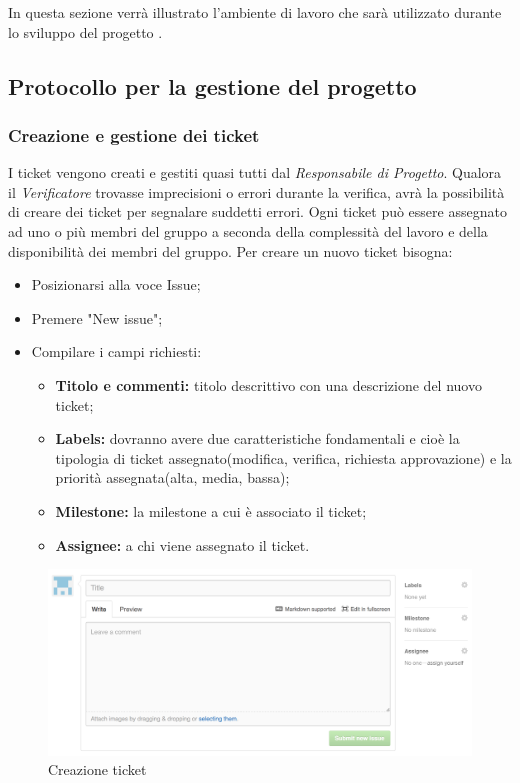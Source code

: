 In questa sezione verrà illustrato l'ambiente di lavoro che sarà utilizzato durante lo sviluppo del progetto \PROGETTO.\\

\subsection{Protocollo per la gestione del progetto}

\subsubsection{Creazione e gestione dei ticket}

I \gls{ticket} vengono creati e gestiti quasi tutti dal \textit{Responsabile di Progetto}.
Qualora il \textit{Verificatore} trovasse imprecisioni o errori durante la verifica, avrà la possibilità di creare dei \gls{ticket} per segnalare suddetti errori.
Ogni \gls{ticket} può essere assegnato ad uno o più membri del gruppo a seconda della complessità del lavoro e della disponibilità dei membri del gruppo.
Per creare un nuovo \gls{ticket} bisogna:

\begin{itemize}
	\item Posizionarsi alla voce Issue;
	\item Premere "New issue";
	\item Compilare i campi richiesti:
	\begin{itemize}
		\item \textbf{Titolo e commenti:} titolo descrittivo con una descrizione del nuovo \gls{ticket};
		\item \textbf{Labels:} dovranno avere due caratteristiche fondamentali e cioè la tipologia di \gls{ticket} assegnato(modifica, verifica, richiesta approvazione) e la priorità assegnata(alta, media, bassa);
		\item \textbf{\gls{Milestone}:} la \gls{milestone} a cui è associato il \gls{ticket};
		\item \textbf{Assignee:} a chi viene assegnato il \gls{ticket}.
	\end{itemize}
\end{itemize}
\begin{figure}[h]
	\centering
	\includegraphics[width=0.7\linewidth]{img/ticket}
	\caption[Creazione ticket]{Creazione \gls{ticket}}
	\label{fig:ticket}
\end{figure}

